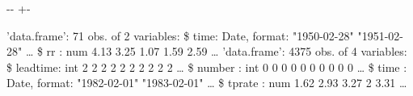 \documentclass[letterpaper,10pt,english]{sphinxmanual}
\newlength\nbsphinxcodecellspacing
\begin{document}
{
\begin{sphinxVerbatim}[commandchars=\\\{\}]
\llap{\color{nbsphinxin}[5]:\,\hspace{\fboxrule}\hspace{\fboxsep}}  

  
\end{sphinxVerbatim}
}

{

\kern-\sphinxverbatimsmallskipamount\kern-\baselineskip
\kern+\FrameHeightAdjust\kern-\fboxrule
\vspace{\nbsphinxcodecellspacing}

\begin{sphinxVerbatim}[commandchars=\\\{\}]
'data.frame':   71 obs. of  2 variables:
 \$ time: Date, format: "1950-02-28" "1951-02-28" {\ldots}
 \$ rr  : num  4.13 3.25 1.07 1.59 2.59 {\ldots}
'data.frame':   4375 obs. of  4 variables:
 \$ leadtime: int  2 2 2 2 2 2 2 2 2 2 {\ldots}
 \$ number  : int  0 0 0 0 0 0 0 0 0 0 {\ldots}
 \$ time    : Date, format: "1982-02-01" "1983-02-01" {\ldots}
 \$ tprate  : num  1.62 2.93 3.27 2 3.31 {\ldots}
\end{sphinxVerbatim}
}
\end{document}
